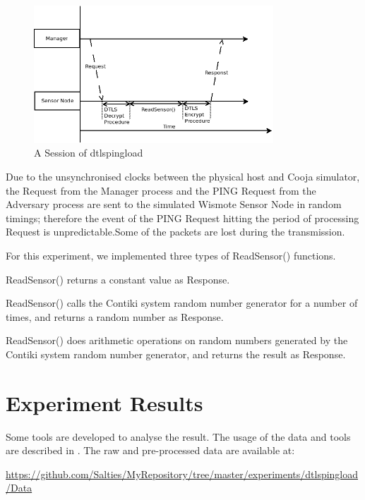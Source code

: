 \begin{figure}
	\center
	\includegraphics[width=0.8\textwidth]{fig/PINGLOAD_Session.png}
	\caption{A Session of dtlspingload}
	\label{Fig: A Session of dtlspingload}
\end{figure}

Due to the unsynchronised clocks between the physical host and Cooja simulator, the Request from the Manager process and the PING Request from the Adversary process are sent to the simulated Wismote Sensor Node in random timings; therefore the event of the PING Request hitting the period of processing Request is unpredictable.Some of the packets are lost during the transmission.

For this experiment, we implemented three types of ReadSensor() functions.

\begin{description}[style=nextline]
	\item[Constant ReadSensor()]
	ReadSensor() returns a constant value as Response.
	\item[Random Number ReadSensor()]
	ReadSensor() calls the Contiki system random number generator for a number of times, and returns a random number as Response.
	\item[Arithmetic ReadSensor()]
	ReadSensor() does arithmetic operations on random numbers generated by the Contiki system random number generator, and returns the result as Response.
\end{description}

\section{Experiment Results}

Some tools are developed to analyse the result. The usage of the data and tools are described in . The raw and pre-processed data are available at: 
\begin{center}
	\url{https://github.com/Salties/MyRepository/tree/master/experiments/dtlspingload/Data}
\end{center}

